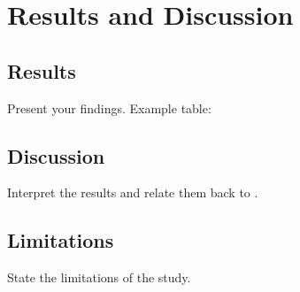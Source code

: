\chapter{Results and Discussion}
\label{ch:results}

\section{Results}
\label{sec:results-main}

Present your findings. Example table:


\section{Discussion}
\label{sec:results-discussion}

Interpret the results and relate them back to .

\section{Limitations}
\label{sec:results-limitations}

State the limitations of the study.
